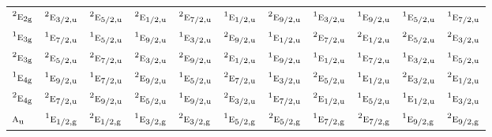 \documentclass[10pt,a4paper]{article}
\numberwithin{equation}{section}
\newcommand{\irr}[1]{\text{\normalfont\scshape #1}}
\newcommand{\conjpair}[1]{{}^{#1}}
\newcommand{\ptag}[1]{\mathrm{#1}}
\begin{document}
{\begin{longtable}{@{}lcccccccccc@{}}
$\conjpair{2}\irr{e}_{2\ptag{g}}$ & $\conjpair{2}\irr{e}_{3/2,\ptag{u}}$ & $\conjpair{2}\irr{e}_{5/2,\ptag{u}}$ & $\conjpair{2}\irr{e}_{1/2,\ptag{u}}$ & $\conjpair{2}\irr{e}_{7/2,\ptag{u}}$ & $\conjpair{1}\irr{e}_{1/2,\ptag{u}}$ & $\conjpair{2}\irr{e}_{9/2,\ptag{u}}$ & $\conjpair{1}\irr{e}_{3/2,\ptag{u}}$ & $\conjpair{1}\irr{e}_{9/2,\ptag{u}}$ & $\conjpair{1}\irr{e}_{5/2,\ptag{u}}$ & $\conjpair{1}\irr{e}_{7/2,\ptag{u}}$\\
$\conjpair{1}\irr{e}_{3\ptag{g}}$ & $\conjpair{1}\irr{e}_{7/2,\ptag{u}}$ & $\conjpair{1}\irr{e}_{5/2,\ptag{u}}$ & $\conjpair{1}\irr{e}_{9/2,\ptag{u}}$ & $\conjpair{1}\irr{e}_{3/2,\ptag{u}}$ & $\conjpair{2}\irr{e}_{9/2,\ptag{u}}$ & $\conjpair{1}\irr{e}_{1/2,\ptag{u}}$ & $\conjpair{2}\irr{e}_{7/2,\ptag{u}}$ & $\conjpair{2}\irr{e}_{1/2,\ptag{u}}$ & $\conjpair{2}\irr{e}_{5/2,\ptag{u}}$ & $\conjpair{2}\irr{e}_{3/2,\ptag{u}}$\\
$\conjpair{2}\irr{e}_{3\ptag{g}}$ & $\conjpair{2}\irr{e}_{5/2,\ptag{u}}$ & $\conjpair{2}\irr{e}_{7/2,\ptag{u}}$ & $\conjpair{2}\irr{e}_{3/2,\ptag{u}}$ & $\conjpair{2}\irr{e}_{9/2,\ptag{u}}$ & $\conjpair{2}\irr{e}_{1/2,\ptag{u}}$ & $\conjpair{1}\irr{e}_{9/2,\ptag{u}}$ & $\conjpair{1}\irr{e}_{1/2,\ptag{u}}$ & $\conjpair{1}\irr{e}_{7/2,\ptag{u}}$ & $\conjpair{1}\irr{e}_{3/2,\ptag{u}}$ & $\conjpair{1}\irr{e}_{5/2,\ptag{u}}$\\
$\conjpair{1}\irr{e}_{4\ptag{g}}$ & $\conjpair{1}\irr{e}_{9/2,\ptag{u}}$ & $\conjpair{1}\irr{e}_{7/2,\ptag{u}}$ & $\conjpair{2}\irr{e}_{9/2,\ptag{u}}$ & $\conjpair{1}\irr{e}_{5/2,\ptag{u}}$ & $\conjpair{2}\irr{e}_{7/2,\ptag{u}}$ & $\conjpair{1}\irr{e}_{3/2,\ptag{u}}$ & $\conjpair{2}\irr{e}_{5/2,\ptag{u}}$ & $\conjpair{1}\irr{e}_{1/2,\ptag{u}}$ & $\conjpair{2}\irr{e}_{3/2,\ptag{u}}$ & $\conjpair{2}\irr{e}_{1/2,\ptag{u}}$\\
$\conjpair{2}\irr{e}_{4\ptag{g}}$ & $\conjpair{2}\irr{e}_{7/2,\ptag{u}}$ & $\conjpair{2}\irr{e}_{9/2,\ptag{u}}$ & $\conjpair{2}\irr{e}_{5/2,\ptag{u}}$ & $\conjpair{1}\irr{e}_{9/2,\ptag{u}}$ & $\conjpair{2}\irr{e}_{3/2,\ptag{u}}$ & $\conjpair{1}\irr{e}_{7/2,\ptag{u}}$ & $\conjpair{2}\irr{e}_{1/2,\ptag{u}}$ & $\conjpair{1}\irr{e}_{5/2,\ptag{u}}$ & $\conjpair{1}\irr{e}_{1/2,\ptag{u}}$ & $\conjpair{1}\irr{e}_{3/2,\ptag{u}}$\\
$\irr{a}_{\ptag{u}}$ & $\conjpair{1}\irr{e}_{1/2,\ptag{g}}$ & $\conjpair{2}\irr{e}_{1/2,\ptag{g}}$ & $\conjpair{1}\irr{e}_{3/2,\ptag{g}}$ & $\conjpair{2}\irr{e}_{3/2,\ptag{g}}$ & $\conjpair{1}\irr{e}_{5/2,\ptag{g}}$ & $\conjpair{2}\irr{e}_{5/2,\ptag{g}}$ & $\conjpair{1}\irr{e}_{7/2,\ptag{g}}$ & $\conjpair{2}\irr{e}_{7/2,\ptag{g}}$ & $\conjpair{1}\irr{e}_{9/2,\ptag{g}}$ & $\conjpair{2}\irr{e}_{9/2,\ptag{g}}$\\

\end{longtable}}
\end{document}
